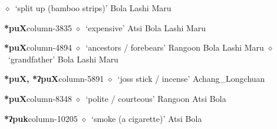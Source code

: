          $\diamond$~`split up (bamboo strips)'
         Bola 
\hspace{1ex}
         Lashi 
\hspace{1ex}
         Maru 
  \item {\footnotesize \textbf{*puX}}{\tiny column-3835}
         $\diamond$~`expensive'
         Atsi 
\hspace{1ex}
         Bola 
\hspace{1ex}
         Lashi 
\hspace{1ex}
         Maru 
  \item {\footnotesize \textbf{*puX}}{\tiny column-4894}
         $\diamond$~`ancestors / forebears'
         Rangoon 
\hspace{1ex}
         Bola 
\hspace{1ex}
         Lashi 
\hspace{1ex}
         Maru 
\hspace{1ex}
         $\diamond$~`grandfather'
         Bola 
\hspace{1ex}
         Lashi 
\hspace{1ex}
         Maru 
  \item {\footnotesize \textbf{*puX, *ʔpuX}}{\tiny column-5891}
         $\diamond$~`joss stick / incense'
         Achang\_Longchuan 
  \item {\footnotesize \textbf{*puX}}{\tiny column-8348}
         $\diamond$~`polite / courteous'
         Rangoon 
\hspace{1ex}
         Atsi 
\hspace{1ex}
         Bola 
  \item {\footnotesize \textbf{*ʔpuk}}{\tiny column-10205}
         $\diamond$~`smoke (a cigarette)'
         Atsi 
\hspace{1ex}
         Bola 
\hspace{1ex}
